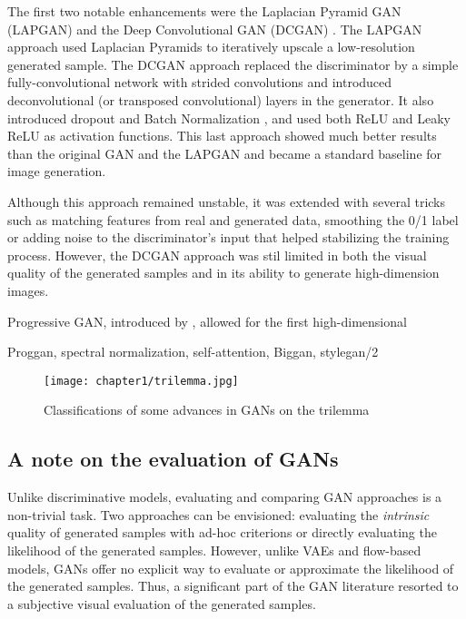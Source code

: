 The first two notable enhancements were the Laplacian Pyramid GAN (LAPGAN) \citep{Denton2015} and the Deep Convolutional GAN (\ac{DCGAN}) \citep{Radford2015}. The LAPGAN approach used Laplacian Pyramids \citep{Burt1983} to iteratively upscale a low-resolution generated sample. The \ac{DCGAN} approach replaced the discriminator by a simple fully-convolutional network \citep{Springenberg2015} with strided convolutions and introduced deconvolutional (or transposed convolutional) layers in the generator. It also introduced dropout \citep{Srivastava2014} and Batch Normalization \citep{Ioffe2015}, and used both \ac{ReLU} \citep{Nair2010} and Leaky \ac{ReLU} \citep{Maas2013} as activation functions. This last approach showed much better results than the original GAN and the LAPGAN and became a standard baseline for image generation.

Although this approach remained unstable, it was extended \citep{Salimans2016} with several tricks such as matching features from real and generated data, smoothing the 0/1 label or adding noise to the discriminator's input \citep{Sonderby2017} that helped stabilizing the training process. However, the DCGAN approach was stil limited in both the visual quality of the generated samples and in its ability to generate high-dimension images.

Progressive GAN, introduced by \citet{Karras2017}, allowed for the first high-dimensional 


Proggan, spectral normalization, self-attention, Biggan,  stylegan/2


\begin{figure}
		\centering
	\texttt{[image: chapter1/trilemma.jpg]}
	\label{fig:trilemma}
	\caption{Classifications of some advances in GANs on the trilemma}
\end{figure}



\subsection{A note on the  evaluation of  GANs}
\label{subs:evaluation_methods}

Unlike discriminative models, evaluating and comparing \ac{GAN} approaches is a non-trivial task. Two approaches can be envisioned: evaluating the \textit{intrinsic} quality of generated samples with ad-hoc criterions or directly evaluating the likelihood of the generated samples. However, unlike \ac{VAE}s and flow-based models, \ac{GAN}s offer no explicit way to evaluate or approximate the likelihood of the generated samples. Thus, a significant part of the \ac{GAN} literature resorted to a subjective visual evaluation of the generated samples. 

